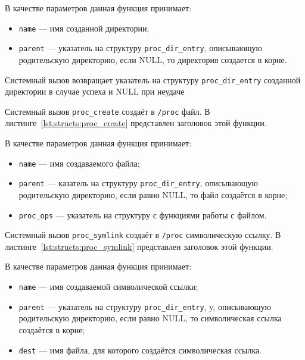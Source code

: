 В качестве параметров данная функция принимает:
\begin{itemize}
	\item \texttt{name} --- имя созданной директории;
	\item \texttt{parent} --- указатель на структуру \texttt{proc\_dir\_entry}, описывающую родительскую директорию, если NULL, то директория создается в корне.
\end{itemize}

Системный вызов возвращает указатель на структуру \texttt{proc\_dir\_entry} созданной директории в случае успеха и NULL при неудаче 

Системный вызов \texttt{proc\_create} создаёт в \texttt{/proc} файл.
В листинге~\ref{lst:structs:proc_create} представлен заголовок этой функции.



В качестве параметров данная функция принимает:
\begin{itemize}
	\item \texttt{name} --- имя создаваемого файла;
	\item \texttt{parent} --- казатель на структуру \texttt{proc\_dir\_entry}, описывающую родительскую директорию, если равно NULL, то файл создаётся в корне;
	\item \texttt{proc\_ops} ---  указатель на структуру с функциями работы с файлом.
\end{itemize}

Системный вызов \texttt{proc\_symlink} создаёт в \texttt{/proc} символическую ссылку.
В листинге~\ref{lst:structs:proc_symlink} представлен заголовок этой функции.



В качестве параметров данная функция принимает:
\begin{itemize}
	\item \texttt{name} --- имя создаваемой символической ссылки;
	\item \texttt{parent} --- указатель на структуру \texttt{proc\_dir\_entry}, y, описывающую родительскую директорию, если равно NULL, то символическая ссылка создаётся в корне;
	\item \texttt{dest} --- имя файла, для которого создаётся символическая ссылка.
\end{itemize}

